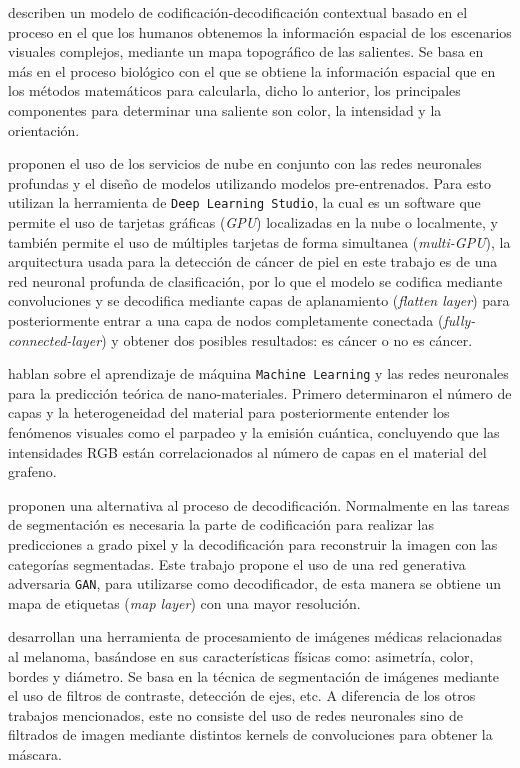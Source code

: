 \citet{KRONER2020261} describen un modelo de codificación-decodificación contextual basado en el proceso en el que los humanos obtenemos la información espacial de los escenarios visuales complejos, mediante un mapa topográfico de las salientes. Se basa en más en el proceso biológico con el que se obtiene la información espacial que en los métodos matemáticos para calcularla, dicho lo anterior, los principales componentes para determinar una saliente son color, la intensidad y la orientación.  

\citet{KADAMPUR2020100282} proponen el uso de los servicios de nube en conjunto con las redes neuronales profundas y el diseño de modelos utilizando modelos pre-entrenados. Para esto utilizan la herramienta de \texttt{Deep Learning Studio}, la cual es un software que permite el uso de tarjetas gráficas (\emph{GPU}) localizadas en la nube o localmente, y también permite el uso de múltiples tarjetas de forma simultanea (\emph{multi-GPU}), la arquitectura usada para la detección de cáncer de piel en este trabajo es de una red neuronal profunda de clasificación, por lo que el modelo se codifica mediante convoluciones y se decodifica mediante capas de aplanamiento (\emph{flatten layer}) para posteriormente entrar a una capa de nodos completamente conectada (\emph{fully-connected-layer}) y obtener dos posibles resultados: es cáncer o no es cáncer.

\citet{zhou2019emerging} hablan sobre el aprendizaje de máquina \texttt{Machine Learning} y las redes neuronales para la predicción teórica de nano-materiales. Primero determinaron el número de capas y la heterogeneidad del material para posteriormente entender los fenómenos visuales como el parpadeo y la emisión cuántica, concluyendo que las intensidades RGB están correlacionados al número de capas en el material del grafeno. 

\citet{DBLP:journals/corr/LucCCV16} proponen una alternativa al proceso de decodificación. Normalmente en las tareas de segmentación es necesaria la parte de codificación para realizar las predicciones a grado pixel y la decodificación para reconstruir la imagen con las categorías segmentadas. Este trabajo propone el uso de una red generativa adversaria \texttt{GAN}, para utilizarse como decodificador, de esta manera se obtiene un mapa de etiquetas (\emph{map layer}) con una mayor resolución.

\citet{JAIN2015735} desarrollan una herramienta de procesamiento de imágenes médicas relacionadas al melanoma, basándose en sus características físicas como: asimetría, color, bordes y diámetro. Se basa en la técnica de segmentación de imágenes mediante el uso de filtros de contraste, detección de ejes, etc. A diferencia de los otros trabajos mencionados, este no consiste del uso de redes neuronales sino de filtrados de imagen mediante distintos kernels de convoluciones para obtener la máscara.

